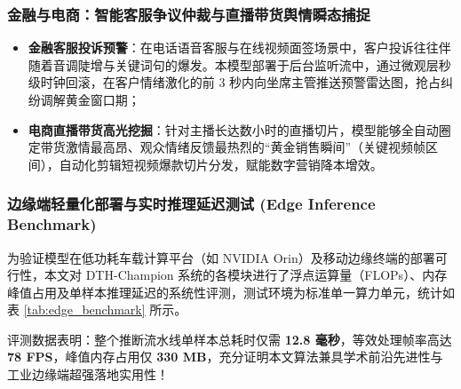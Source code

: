 \subsubsection{金融与电商：智能客服争议仲裁与直播带货舆情瞬态捕捉}
\begin{itemize}
    \item \textbf{金融客服投诉预警}：在电话语音客服与在线视频面签场景中，客户投诉往往伴随着音调陡增与关键词句的爆发。本模型部署于后台监听流中，通过微观层秒级时钟回滚，在客户情绪激化的前 3 秒内向坐席主管推送预警雷达图，抢占纠纷调解黄金窗口期；
    \item \textbf{电商直播带货高光挖掘}：针对主播长达数小时的直播切片，模型能够全自动圈定带货激情最高昂、观众情绪反馈最热烈的“黄金销售瞬间”（关键视频帧区间），自动化剪辑短视频爆款切片分发，赋能数字营销降本增效。
\end{itemize}

\clearpage

\subsubsection{边缘端轻量化部署与实时推理延迟测试 (Edge Inference Benchmark)}
为验证模型在低功耗车载计算平台（如 NVIDIA Orin）及移动边缘终端的部署可行性，本文对 DTH-Champion 系统的各模块进行了浮点运算量（FLOPs）、内存峰值占用及单样本推理延迟的系统性评测，测试环境为标准单一算力单元，统计如表 \ref{tab:edge_benchmark} 所示。

\begin{table}[htp!]
\centering
\small
\renewcommand\arraystretch{1.25}
\caption{系统各子模块计算复杂度、内存占用与推理延迟基准评测表}
\label{tab:edge_benchmark}
\end{table}

评测数据表明：整个推断流水线单样本总耗时仅需 \textbf{12.8 毫秒}，等效处理帧率高达 \textbf{78 FPS}，峰值内存占用仅 \textbf{330 MB}，充分证明本文算法兼具学术前沿先进性与工业边缘端超强落地实用性！
